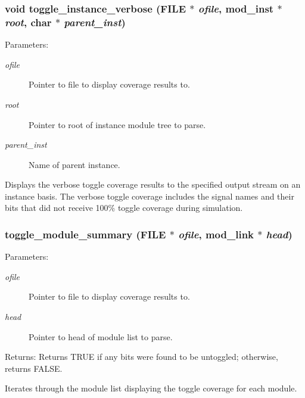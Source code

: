 \subsubsection{\setlength{\rightskip}{0pt plus 5cm}void toggle\_\-instance\_\-verbose (FILE $\ast$ {\em ofile}, {\bf mod\_\-inst} $\ast$ {\em root}, char $\ast$ {\em parent\_\-inst})}\label{toggle_8c_a9}


\begin{Desc}
\item[Parameters:]
\begin{description}
\item[{\em ofile}]Pointer to file to display coverage results to. \item[{\em root}]Pointer to root of instance module tree to parse. \item[{\em parent\_\-inst}]Name of parent instance.\end{description}
\end{Desc}
Displays the verbose toggle coverage results to the specified output stream on an instance basis. The verbose toggle coverage includes the signal names and their bits that did not receive 100\% toggle coverage during simulation. 
\subsubsection{ toggle\_\-module\_\-summary (FILE $\ast$ {\em ofile}, {\bf mod\_\-link} $\ast$ {\em head})}\label{toggle_8c_a7}


\begin{Desc}
\item[Parameters:]
\begin{description}
\item[{\em ofile}]Pointer to file to display coverage results to. \item[{\em head}]Pointer to head of module list to parse.\end{description}
\end{Desc}
\begin{Desc}
\item[Returns:]Returns TRUE if any bits were found to be untoggled; otherwise, returns FALSE.\end{Desc}
Iterates through the module list displaying the toggle coverage for each module. 
